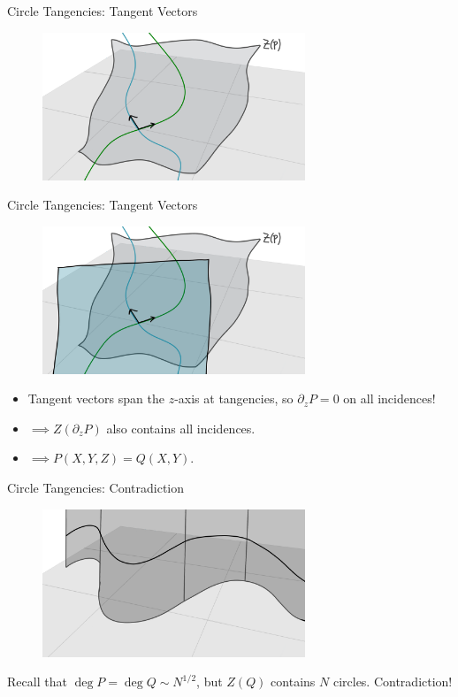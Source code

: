 \documentclass{beamer}
\newcommand{\nfr}[1]{\begin{frame} #1
\end{frame}}
\begin{document}
\nfr{{Circle Tangencies: Tangent Vectors}
\begin{figure}[h]
    \centering
    \includegraphics[width=0.7\textwidth]{images/lots_of_dots_h.png}
\end{figure}

}
\nfr{{Circle Tangencies: Tangent Vectors}
\begin{figure}[h]
    \centering
    \includegraphics[width=0.7\textwidth]{images/lots_of_dots_i.png}
\end{figure}
\begin{itemize}
    \item Tangent vectors span the $z$-axis at tangencies, so $\partial_z P = 0$ on all incidences! \pause
    \item $\implies Z(\partial_z P)$ also contains all incidences. \pause
    \item $\implies P(X,Y,Z) = Q(X,Y)$.
\end{itemize}
}
\nfr{{Circle Tangencies: Contradiction}
\begin{figure}[h]
    \centering
    \includegraphics[width=0.7\textwidth]{images/lots_of_dots_j.png}
\end{figure}
Recall that $\deg P = \deg Q \sim N^{1/2}$, but $Z(Q)$ contains $N$ circles.
Contradiction!
}
\end{document}

